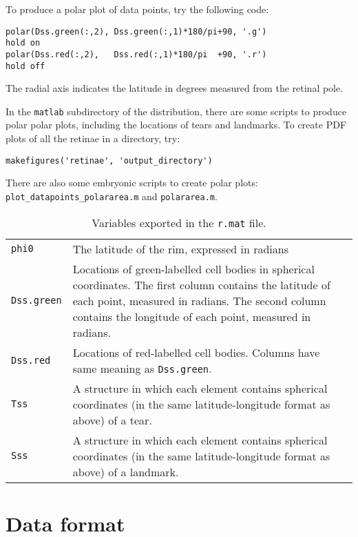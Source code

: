 \documentclass{article}
\begin{document}
To produce a polar plot of data points, try the following code:
\begin{verbatim}
polar(Dss.green(:,2), Dss.green(:,1)*180/pi+90, '.g')
hold on
polar(Dss.red(:,2),   Dss.red(:,1)*180/pi  +90, '.r')
hold off
\end{verbatim}
The radial axis indicates the latitude in degrees measured from the
retinal pole.

In the \texttt{matlab} subdirectory of the distribution, there are
some scripts to produce polar polar plots, including the locations of
tears and landmarks. To create PDF plots of all the retinae in a
directory, try:
\begin{verbatim}
makefigures('retinae', 'output_directory')
\end{verbatim}

There are also some embryonic scripts to create polar plots:
\texttt{plot\_datapoints\_polararea.m} and \texttt{polararea.m}.

\begin{table}
  \begin{tabularx}{\linewidth}{lX}
    \hline \texttt{phi0} & The latitude of the rim, expressed in
    radians
    \\
    \texttt{Dss.green} & Locations of green-labelled cell bodies in
    spherical coordinates. The first column contains the latitude of
    each point, measured in radians. The second column contains the
    longitude of each point, measured in radians. \\
    \texttt{Dss.red}   & Locations of red-labelled cell
    bodies. Columns have same meaning as \texttt{Dss.green}. \\
    \texttt{Tss}       & A structure in which each element contains
    spherical coordinates (in the same latitude-longitude format as
    above) of a tear. \\
    \texttt{Sss}       & A structure in which each element contains
    spherical coordinates (in the same latitude-longitude format as
    above) of a landmark. \\
    \hline
  \end{tabularx}
  \caption{Variables exported in the \texttt{r.mat} file.}
  \label{tab:matlab-export}
\end{table}

\appendix

\section{Data format}
\label{manual:sec:reading-data}
\end{document}
